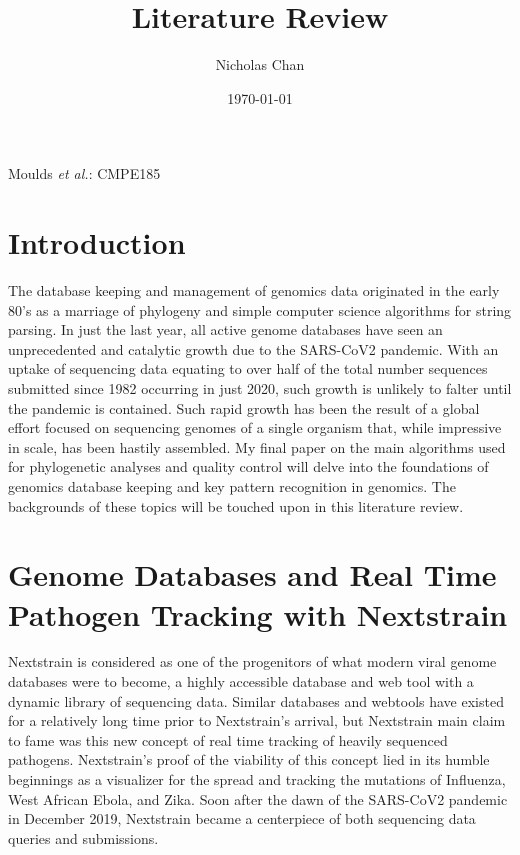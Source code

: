 \documentclass[12pt,journal,compsoc]{IEEEtran}
\title{Literature Review}
\author{Nicholas Chan}
\date{\today}
\begin{document}
%
{Moulds \MakeLowercase{\textit{et al.}}: CMPE185}



\maketitle

\section*{Introduction}
The database keeping and management of genomics data originated in the early 80’s as a marriage of phylogeny and simple computer science algorithms for string parsing. In just the last year, all active genome databases have seen an unprecedented and catalytic growth due to the SARS-CoV2 pandemic. With an uptake of sequencing data equating to over half of the total number sequences submitted since 1982 occurring in just 2020\cite{table:GenStats}, such growth is unlikely to falter until the pandemic is contained. Such rapid growth has been the result of a global effort focused on sequencing genomes of a single organism that, while impressive in scale, has been hastily assembled. My final paper on the main algorithms used for phylogenetic analyses and quality control will delve into the foundations of genomics database keeping and key pattern recognition in genomics. The backgrounds of these topics will be touched upon in this literature review.
\section{Genome Databases and Real Time Pathogen Tracking with Nextstrain}
Nextstrain is considered as one of the progenitors of what modern viral genome databases were to become, a highly accessible database and web tool with a dynamic library of sequencing data. Similar databases and webtools have existed for a relatively long time prior to Nextstrain's arrival, but Nextstrain main claim to fame was this new concept of real time tracking of heavily sequenced pathogens. Nextstrain's proof of the viability of this concept lied in its humble beginnings as a visualizer for the spread and tracking the mutations of Influenza, West African Ebola, and Zika.\cite{binf:ox} Soon after the dawn of the SARS-CoV2 pandemic in December 2019, Nextstrain became a centerpiece of both sequencing data queries and submissions. 
\end{document}
